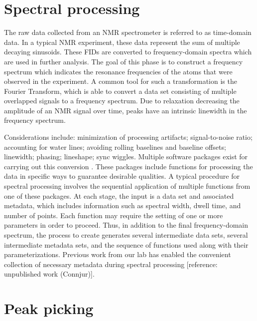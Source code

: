 \section{Spectral processing}


The raw data collected from an NMR spectrometer is referred to as 
time-domain data.  In a typical NMR experiment, these data represent the 
sum of multiple decaying sinusoids.  These FIDs are converted to 
frequency-domain spectra which are used in further analysis.  The goal of 
this phase is to construct a frequency spectrum which indicates the resonance 
frequencies of the atoms that were observed in the experiment.  A common tool 
for such a transformation is the Fourier Transform, which is able to convert 
a data set consisting of multiple overlapped signals to a frequency spectrum.  
Due to relaxation decreasing the amplitude of an NMR signal over time, peaks 
have an intrinsic linewidth in the frequency spectrum.

Considerations include:  minimization of processing artifacts; signal-to-noise 
ratio; accounting for water lines; avoiding rolling baselines and baseline 
offsets; linewidth; phasing; lineshape; sync wiggles.  Multiple software 
packages exist for carrying out this conversion \cite{nmrpipe, rnmrtk}.
These packages include functions for processing the data in specific ways to 
guarantee desirable qualities.  A typical procedure for spectral processing 
involves the sequential application of multiple functions from one of these 
packages.  At each stage, the input is a data set and associated metadata, 
which includes information such as spectral width, dwell time, and number of 
points.  Each function may require the setting of one or more parameters in 
order to proceed.  Thus, in addition to the final frequency-domain spectrum, 
the process to create generates several intermediate data sets, several 
intermediate metadata sets, and the sequence of functions used along with 
their parameterizations.  Previous work from our lab has enabled the 
convenient collection of necessary metadata during spectral 
processing [reference: unpublished work (Connjur)].

\section{Peak picking}

